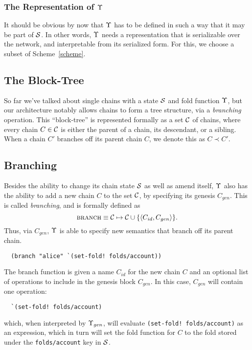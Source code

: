 \subsubsection{The Representation of $\Upsilon$}

It should be obvious by now that $\Upsilon$ has to be defined in such a way that
it may be part of $\mathcal{S}$. In other words, $\Upsilon$ needs a representation
that is serializable over the network, and interpretable from its serialized
form. For this, we choose a subset of Scheme~\ref{scheme}.

\subsection{The Block-Tree}

So far we've talked about single chains with a state $\mathcal{S}$ and fold function
$\Upsilon$, but our architecture notably allows chains to form a tree structure,
via a \emph{branching} operation. This ``block-tree'' is represented formally
as a set $\mathcal{C}$ of chains, where every chain $C \in \mathcal{C}$ is either the
parent of a chain, its descendant, or a sibling. When a chain $C'$ branches off
its parent chain $C$, we denote this as $C \prec C'$.

\subsection{Branching}

Besides the ability to change its chain state $\mathcal{S}$ as well as amend itself,
$\Upsilon$ also has the ability to add a new chain $C$ to the set $\mathcal{C}$, by
specifying its genesis $C_{gen}$. This is called \emph{branching}, and is
formally defined as
\[
    \text{\normalfont\scshape branch} \equiv \mathcal{C} \mapsto \mathcal{C} \cup \{\langle C_{id}, C_{gen} \rangle\}.
\]
Thus, via $C_{gen}$, $\Upsilon$ is able to specify new semantics that branch off
its parent chain.

\begin{verbatim}
  (branch "alice" `(set-fold! folds/account))
\end{verbatim}

The branch function is given a name $C_{id}$ for the new chain $C$ and an
optional list of operations to include in the genesis block $C_{gen}$. In this
case, $C_{gen}$ will contain one operation:

\begin{verbatim}
  `(set-fold! folds/account)
\end{verbatim}
which, when interpreted by $\Upsilon_{gen}$, will evaluate \verb|(set-fold! folds/account)|
as an expression, which in turn will set the fold function for $C$ to the fold stored
under the \texttt{folds/account} key in $\mathcal{S}$.

